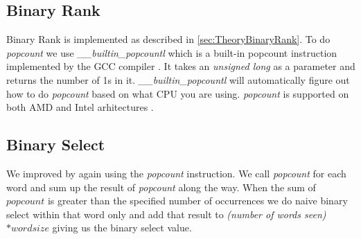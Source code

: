 \subsection{Binary Rank}
Binary Rank is implemented as described in \ref{sec:TheoryBinaryRank}. To do \textit{popcount} we use \textit{\_\_builtin\_popcountl} which is a built-in popcount instruction implemented by the GCC compiler \citep{Popcount-GCC-Builtin}. It takes an \textit{unsigned long} as a parameter and returns the number of 1s in it. \textit{\_\_builtin\_popcountl} will automatically figure out how to do \textit{popcount} based on what CPU you are using. \textit{popcount} is supported on both AMD \citep{AMD-Popcount} and Intel arhitectures \citep{Intel-Popcount}.

\subsection{Binary Select}
\label{sec:ImplBinarySelect}
We improved  by again using the \textit{popcount} instruction. We call \textit{popcount} for each word and sum up the result of \textit{popcount} along the way. When the sum of $popcount$  is greater than the specified number of occurrences we do naive binary select within that word only and add that result to \textit{(number of words seen)} $* wordsize$ giving us the binary select value.


